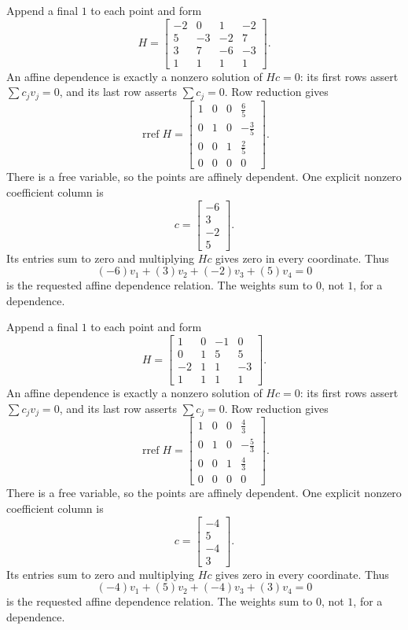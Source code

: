 Append a final $1$ to each point and form
\[H=\begin{bmatrix}-2&0&1&-2\\5&-3&-2&7\\3&7&-6&-3\\1&1&1&1\end{bmatrix}.\]
An affine dependence is exactly a nonzero solution of $Hc=0$: its first rows assert $\sum c_jv_j=0$, and its last row asserts $\sum c_j=0$. Row reduction gives
\[\operatorname{rref}H=\begin{bmatrix}1&0&0&\frac{6}{5}\\0&1&0&- \frac{3}{5}\\0&0&1&\frac{2}{5}\\0&0&0&0\end{bmatrix}.\]
There is a free variable, so the points are affinely dependent. One explicit nonzero coefficient column is
\[c=\begin{bmatrix}-6\\3\\-2\\5\end{bmatrix}.\]
Its entries sum to zero and multiplying $Hc$ gives zero in every coordinate. Thus
\[(-6)v_1 + (3)v_2 + (-2)v_3 + (5)v_4=0\]
is the requested affine dependence relation. The weights sum to $0$, not $1$, for a dependence.

Append a final $1$ to each point and form
\[H=\begin{bmatrix}1&0&-1&0\\0&1&5&5\\-2&1&1&-3\\1&1&1&1\end{bmatrix}.\]
An affine dependence is exactly a nonzero solution of $Hc=0$: its first rows assert $\sum c_jv_j=0$, and its last row asserts $\sum c_j=0$. Row reduction gives
\[\operatorname{rref}H=\begin{bmatrix}1&0&0&\frac{4}{3}\\0&1&0&- \frac{5}{3}\\0&0&1&\frac{4}{3}\\0&0&0&0\end{bmatrix}.\]
There is a free variable, so the points are affinely dependent. One explicit nonzero coefficient column is
\[c=\begin{bmatrix}-4\\5\\-4\\3\end{bmatrix}.\]
Its entries sum to zero and multiplying $Hc$ gives zero in every coordinate. Thus
\[(-4)v_1 + (5)v_2 + (-4)v_3 + (3)v_4=0\]
is the requested affine dependence relation. The weights sum to $0$, not $1$, for a dependence.

